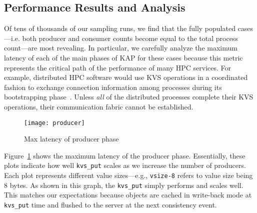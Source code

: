 \subsection{Performance Results and Analysis}
\label{results}
Of tens of thousands of our sampling runs, we find that the fully populated
cases---i.e. both producer and consumer counts become equal to the total
process count---are most revealing. In particular, we carefully analyze 
the maximum latency of each of the main phases of KAP for these cases 
because this metric represents the critical path of the performance of
many HPC services. For example, distributed 
HPC software would use KVS operations in a coordinated fashion to exchange 
connection information among processes during its bootstrapping 
phase~\cite{LIBI,PMI2}. Unless {\em all} 
of the distributed processes complete their
KVS operations, their communication fabric cannot be established. 

\begin{figure}
  \centering
  \texttt{[image: producer]}
  \caption{Max latency of producer phase}
  \label{fig:prod}
\end{figure}

Figure~\ref{fig:prod} shows the maximum latency of the producer phase.
Essentially, these plots indicate how well {\tt kvs\_put}
scales as we increase the number of producers. Each plot represents
different value sizes---e.g., {\tt vsize-8} refers to value size being
8 bytes. As shown in this graph, the {\tt kvs\_put} simply performs and
scales well. This matches our expectations because objects
are cached in write-back mode at {\tt kvs\_put} time and flushed to the
server at the next consistency event. 

\ifcomments
{}
\fi

%

